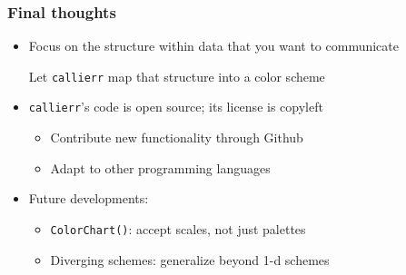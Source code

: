 \documentclass{beamer}
\begin{document}
\begin{frame}
\frametitle{Final thoughts}
\begin{itemize}
 \item Focus on the structure within data that you want to communicate 
 
 Let \texttt{callierr} map that structure into a color scheme
 \vspace{1em}
 \item \texttt{callierr}'s code is open source; its license is copyleft
 \begin{itemize}
  \item Contribute new functionality through Github
  \item Adapt to other programming languages
 \end{itemize}
 \vspace{1em}
 \item Future developments:
 \begin{itemize}
  \item \texttt{ColorChart()}: accept scales, not just palettes
  \item Diverging schemes: generalize beyond 1-d schemes
 \end{itemize}
\end{itemize}
\end{frame}
\end{document}
